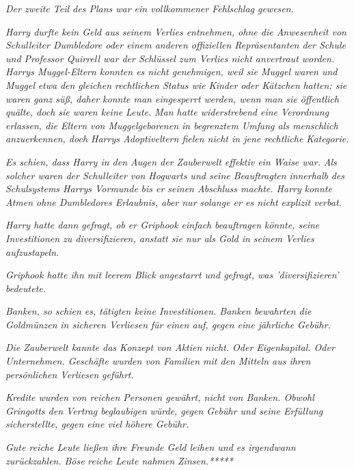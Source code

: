 {\emph{Der zweite Teil des Plans war ein vollkommener Fehlschlag gewesen.}

\emph{Harry durfte kein Geld aus seinem Verlies entnehmen, ohne die Anwesenheit von Schulleiter Dumbledore oder einem anderen offiziellen Repräsentanten der Schule und Professor Quirrell war der Schlüssel zum Verlies nicht anvertraut worden. Harrys Muggel-Eltern konnten es nicht genehmigen, weil sie Muggel waren und Muggel} \emph{etwa} \emph{den gleichen rechtlichen Status wie Kinder oder Kätzchen} \emph{hatten: sie waren ganz süß, daher konnte man eingesperrt werden, wenn man sie öffentlich quälte, doch sie waren keine} \emph{\emph{Leute.}} \emph{Man hatte widerstrebend eine Verordnung erlassen, die Eltern von Muggelgeborenen in begrenztem Umfang als menschlich anzuerkennen, doch Harrys Adoptiveltern fielen nicht in jene rechtliche Kategorie.}

\emph{Es schien, dass Harry in den Augen der Zauberwelt effektiv ein Waise war.} \emph{Als solcher waren der Schulleiter von Hogwarts und seine Beauftragten} \emph{\emph{innerhalb}} \emph{des Schulsystems Harrys Vormunde} \emph{bis er seinen Abschluss machte. Harry} \emph{\emph{konnte}} \emph{Atmen ohne Dumbledores Erlaubnis, aber nur} \emph{solange er es nicht explizit verbat.}

\emph{Harry hatte dann gefragt, ob er Griphook einfach} \emph{\emph{beauftragen}} \emph{könnte, seine Investitionen zu diversifizieren, anstatt sie nur als Gold in seinem Verlies aufzustapeln.}

\emph{Griphook hatte ihn mit leerem Blick angestarrt und gefragt, was 'diversifizieren' bedeutete.}

\emph{Banken, so schien es, tätigten keine Investitionen. Banken bewahrten die Goldmünzen} \emph{in sicheren Verliesen} \emph{für einen auf, gegen eine jährliche Gebühr.}

\emph{Die Zauberwelt kannte das Konzept von Aktien nicht. Oder Eigenkapital. Oder Unternehmen. Geschäfte wurden von Familien mit den Mitteln aus ihren persönlichen Verliesen} \emph{geführt.}

\emph{Kredite wurden von reichen Personen gewährt, nicht von Banken. Obwohl Gringotts den Vertrag beglaubigen} \emph{würde, gegen Gebühr und seine Erfüllung sicherstellte, gegen eine viel höhere Gebühr.}

\emph{Gute reiche Leute ließen ihre Freunde Geld leihen und es irgendwann zurückzahlen.} \emph{\emph{Böse}} \emph{reiche Leute nahmen} \emph{\emph{Zinsen.}*****}

}
